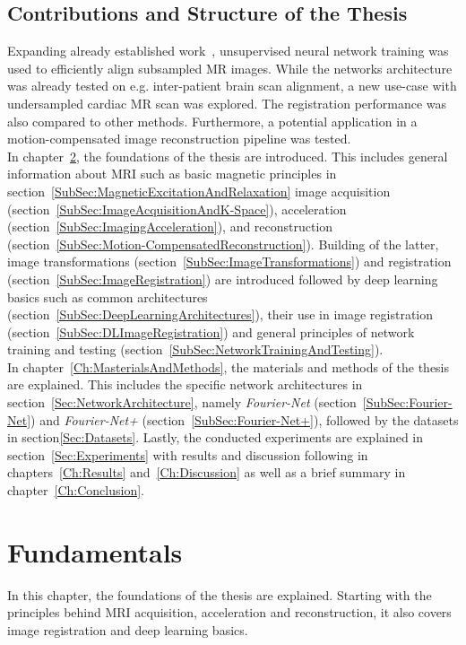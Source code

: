 \documentclass[english,version-2022-01]{uzl-thesis} %
\begin{document}
\section{Contributions and Structure of the Thesis} \label{Sec:ContributionsAndStructure}
Expanding already established work~\cite{Fourier-Net,Fourier-Net+}, unsupervised neural network training was used to efficiently align subsampled MR images. While the networks architecture was already tested on e.g. inter-patient brain scan alignment, a new use-case with undersampled cardiac MR scan was explored. The registration performance was also compared to other methods. Furthermore, a  potential application in a motion-compensated image reconstruction pipeline was tested.\\
In chapter~\ref{Ch:Fundamentals}, the foundations of the thesis are introduced. This includes general information about MRI such as basic magnetic principles in section~\ref{SubSec:MagneticExcitationAndRelaxation} image acquisition (section~\ref{SubSec:ImageAcquisitionAndK-Space}), acceleration (section~\ref{SubSec:ImagingAcceleration}), and reconstruction (section~\ref{SubSec:Motion-CompensatedReconstruction}). Building of the latter, image transformations (section~\ref{SubSec:ImageTransformations}) and registration (section~\ref{SubSec:ImageRegistration}) are introduced followed by deep learning basics such as common architectures (section~\ref{SubSec:DeepLearningArchitectures}), their use in image registration (section~\ref{SubSec:DLImageRegistration}) and general principles of network training and testing (section~\ref{SubSec:NetworkTrainingAndTesting}).\\
In chapter~\ref{Ch:MasterialsAndMethods}, the materials and methods of the thesis are explained. This includes the specific network architectures in section~\ref{Sec:NetworkArchitecture}, namely \emph{Fourier-Net} (section~\ref{SubSec:Fourier-Net}) and \emph{Fourier-Net+} (section~\ref{SubSec:Fourier-Net+}), followed by the datasets in section\ref{Sec:Datasets}.
Lastly, the conducted experiments are explained in section~\ref{Sec:Experiments} with results and discussion following in chapters~\ref{Ch:Results} and~\ref{Ch:Discussion} as well as a brief summary in chapter~\ref{Ch:Conclusion}.



\chapter{Fundamentals} \label{Ch:Fundamentals}
In this chapter, the foundations of the thesis are explained. Starting with the principles behind MRI acquisition, acceleration and reconstruction, it also covers image registration and deep learning basics.
\end{document}
